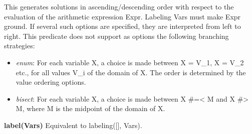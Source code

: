 This generates solutions in ascending/descending order with respect to the evaluation of the arithmetic expression Expr. Labeling Vars must make Expr ground. If several such options are specified, they are interpreted from left to right.\newline
This predicate does not support as options the following branching strategies:\newline
\begin{itemize}
    \item \textit{enum}: For each variable X, a choice is made between X = V\_1, X = V\_2 etc., for all values V\_i of the domain of X. The order is determined by the value ordering options.
    \item \textit{bisect}: For each variable X, a choice is made between X \#=< M and X \#> M, where M is the midpoint of the domain of X.
\end{itemize}
\textbf{label(Vars)}\newline\newline
Equivalent to labeling([], Vars).

